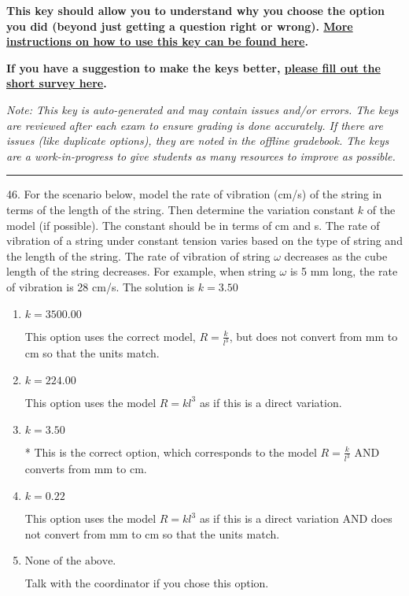 \documentclass{extbook}[14pt]
\begin{document}
\textbf{This key should allow you to understand why you choose the option you did (beyond just getting a question right or wrong). \href{https://xronos.clas.ufl.edu/mac1105spring2020/courseDescriptionAndMisc/Exams/LearningFromResults}{More instructions on how to use this key can be found here}.}

\textbf{If you have a suggestion to make the keys better, \href{https://forms.gle/CZkbZmPbC9XALEE88}{please fill out the short survey here}.}

\textit{Note: This key is auto-generated and may contain issues and/or errors. The keys are reviewed after each exam to ensure grading is done accurately. If there are issues (like duplicate options), they are noted in the offline gradebook. The keys are a work-in-progress to give students as many resources to improve as possible.}

\rule{\textwidth}{0.4pt}

46. For the scenario below, model the rate of vibration (cm/s) of the string in terms of the length of the string. Then determine the variation constant $k$ of the model (if possible). The constant should be in terms of cm and s.
The rate of vibration of a string under constant tension varies based on the type of string and the length of the string. The rate of vibration of string $\omega$ decreases as the cube length of the string decreases. For example, when string $\omega$ is 5 mm long, the rate of vibration is 28 cm/s. 
The solution is $ k = 3.50 $ 

\begin{enumerate}[label=\Alph*.] 
\item $ k = 3500.00 $ 

 This option uses the correct model, $R = \frac{k}{l^{3}}$, but does not convert from mm to cm so that the units match. 
\item $ k = 224.00 $ 

 This option uses the model $R = kl^{3}$ as if this is a direct variation. 
\item $ k = 3.50 $ 

 * This is the correct option, which corresponds to the model $R = \frac{k}{l^{3}}$ AND converts from mm to cm. 
\item $ k = 0.22 $ 

 This option uses the model $R = kl^{3}$ as if this is a direct variation AND does not convert from mm to cm so that the units match. 
\item $ \text{None of the above.} $ 

 Talk with the coordinator if you chose this option. 
\end{enumerate} 
 
\end{document}
